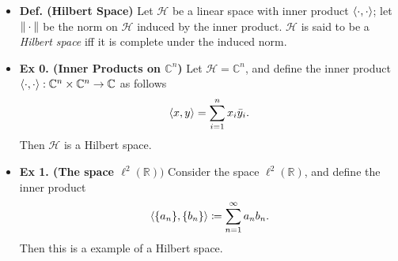 \documentclass{article}
\begin{document}
\begin{itemize}
\begin{solutions}
\begin{enumerate}[itemsep =-2pt,label = (\arabic{*})]
				\item Let $\lambda \in \mathbb{C}$. Then 
					\begin{align}
						\begin{split}
							\norm{\lambda x} &= \sqrt{\braket{\lambda x, \lambda x}} = \sqrt{\lambda \braket{x, \lambda x}} \\
							&= \sqrt{\lambda \bar{\lambda}\braket{x,x}} \\
							&= |\lambda|\sqrt{\braket{x,x}} = |\lambda|\norm{x}. 
						\end{split}
					\end{align}
				\item Now, we will prove that $\norm{\empspace}$ satisfies the triangle inequality. Let $x, y \in \mathscr{H}$. Then 
					\begin{align}
						\begin{split}
							\norm{x + y}^{2} &= \braket{x + y, x + y} = \braket{x, x + y} + \braket{y, x + y} \\
							&= \overline{\braket{x, x} + \braket{y,x}} + \overline{\braket{x, y} + \braket{y,y}} \\
							&= (\norm{x}^{2} + \norm{y}^{2}) + 2\mathfrak{R}\braket{x,y} \\
							&\leq (\norm{x}^{2} + \norm{y}^{2}) + 2\norm{x}\norm{y} \qquad (\text{by Cauchy-Schwarz}) \\
							&= (\norm{x} + \norm{y})^{2}. 
						\end{split}
					\end{align}
				Taking the square root concludes the proof. 
			\end{enumerate}
	\end{solutions} 	
	\item \textbf{Def. (Hilbert Space)} Let $\mathscr{H}$ be a linear space with inner product $\braket{\cdot,\cdot}$; let $\norm{\empspace}$ be the norm on $\mathscr{H}$ induced by the inner product. $\mathscr{H}$ is said to be a \textit{Hilbert space} iff it is complete under the induced norm. 
	\item \textbf{Ex 0. (Inner Products on $\mathbb{C}^{n}$)} Let $\mathscr{H} = \mathbb{C}^{n}$, and define the inner product $\braket{\cdot,\cdot}: \mathbb{C}^{n} \times \mathbb{C}^{n} \to \mathbb{C}$ as follows 
		\begin{equation}
			\braket{x,y} = \sum_{i = 1}^{n}x_{i}\bar{y}_{i}. 
		\end{equation} 
	Then $\mathscr{H}$ is a Hilbert space. 
	\item \textbf{Ex 1. (The space $\ell^{2}(\mathbb{R}))$} Consider the space $\ell^{2}(\mathbb{R})$, and define the inner product
		\begin{equation}
			\braket{\{a_{n}\}, \{b_{n}\}} \coloneqq \sum_{n = 1}^{\infty}a_{n}b_{n}. 
		\end{equation}
	Then this is a example of a Hilbert space. 
\end{itemize}
\newpage 
\end{document}
